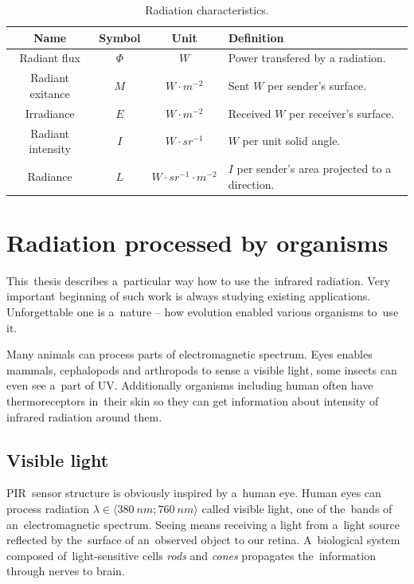 \begin{table}
\begin{tabular}{|c|c|c|l|} \hline
\textbf{Name}             & \textbf{Symbol} & \textbf{Unit}                 & \textbf{Definition}                             \\ \hline
Radiant flux        & $\Phi$          & $W$                           & Power transfered by a radiation.                \\ \hline
Radiant exitance    & $M$             & $W\cdot m^{-2}$               & Sent $W$ per sender's surface.                  \\ \hline 
Irradiance          & $E$             & $W\cdot m^{-2}$               & Received $W$ per receiver's surface.            \\ \hline
Radiant intensity   & $I$             & $W\cdot sr^{-1}$              & $W$ per unit solid angle.                       \\ \hline
Radiance            & $L$             & $W\cdot sr^{-1}\cdot m^{-2}$  & $I$ per sender's area projected to a direction. \\ \hline
\end{tabular}
\caption{Radiation characteristics.\label{table:units} \cite{TemperatureMeasuring}}
\end{table}




\newpage
\section{Radiation processed by organisms}
This~thesis describes a~particular way how to use the~infrared radiation. Very important beginning of such
work is always studying existing applications. Unforgettable one is a~nature -- how evolution enabled 
various organisms to~use it.

Many animals can process parts of electromagnetic spectrum. Eyes enables mammals, cephalopods and arthropods
to sense a visible light, some insects can even see a~part of UV. Additionally organisms including human often
have thermoreceptors in~their skin so they can get information about intensity of infrared radiation around them.


\subsection*{Visible light}
\label{subsection:eye}
PIR~sensor structure is obviously inspired by a~human eye. Human eyes can process radiation
$\lambda \in \langle 380~nm;760~nm \rangle$ called visible light, one of the~bands of an~electromagnetic spectrum.
Seeing means receiving a light from a~light source reflected by the~surface of an~observed object to our retina.
A~biological system composed of~light-sensitive cells {\it rods} and {\it cones} propagates the~information
through nerves to brain.

